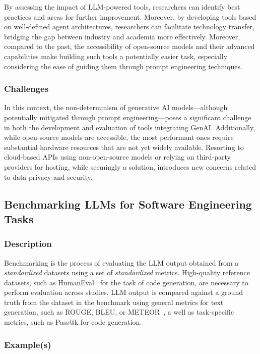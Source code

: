 \documentclass[11pt]{article}
\begin{document}
By assessing the impact of LLM-powered tools, researchers can identify best practices and areas for further improvement.
Moreover, by developing tools based on well-defined agent architectures, researchers can facilitate technology transfer, bridging the gap between industry and academia more effectively. Moreover, compared to the past, the accessibility of open-source models and their advanced capabilities make building such tools a potentially easier task, especially considering the ease of guiding them through prompt engineering techniques.

\subsubsection{Challenges}


In this context, the non-determinism of generative AI models—although potentially mitigated through prompt engineering—poses a significant challenge in both the development and evaluation of tools integrating GenAI. 
Additionally, while open-source models are accessible, the most performant ones require substantial hardware resources that are not yet widely available. Resorting to cloud-based APIs using non-open-source models or relying on third-party providers for hosting, while seemingly a solution, introduces new concerns related to data privacy and security.


\subsection{Benchmarking LLMs for Software Engineering Tasks}

\subsubsection{Description}

Benchmarking is the process of evaluating the LLM output obtained from a \emph{standardized} datasets using a set of \emph{standardized} metrics.
High-quality reference datasets, such as HumanEval~\cite{DBLP:journals/corr/abs-2107-03374} for the task of code generation, are necessary to perform evaluation across studies.
LLM output is compared against a ground truth from the dataset in the benchmark using general metrics for text generation, such as ROUGE, BLEU, or METEOR~\cite{10.1145/3695988}, a well as task-specific metrics, such as Pass@k for code generation.

\subsubsection{Example(s)}
\end{document}

